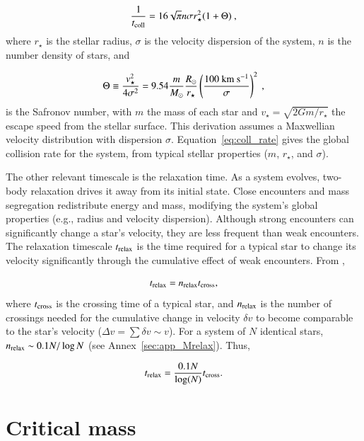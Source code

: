 \begin{equation}
	\label{eq:coll_rate}
	\frac{1}{t_{\rm coll}} = 16\sqrt{\pi} n \sigma r_{\star}^2(1 + \Theta)~,
\end{equation}
where $r_{\star}$ is the stellar radius, $\sigma$ is the velocity dispersion of the system, $n$ is the number density of stars, and

\begin{equation}
	\label{eq:safronov_number}
	\Theta \equiv \frac{v_{\star}^2}{4 \sigma^2} = 9.54 \frac{m}{M_{\odot}} \frac{R_{\odot}}{r_{\star}} \left(\frac{100~{\rm km}~{\rm s}^{-1}}{\sigma}\right)^2~,
\end{equation}
is the Safronov number, with $m$ the mass of each star and $v_{\star} = \sqrt{2Gm/r_{\star}}$ the escape speed from the stellar surface. This derivation assumes a Maxwellian velocity distribution with dispersion $\sigma$. Equation~\eqref{eq:coll_rate} gives the global collision rate for the system, from typical stellar properties ($m$, $r_{\star}$, and $\sigma$).

The other relevant timescale is the relaxation time. As a system evolves, two-body relaxation drives it away from its initial state. Close encounters and mass segregation redistribute energy and mass, modifying the system's global properties (e.g., radius and velocity dispersion). Although strong encounters can significantly change a star's velocity, they are less frequent than weak encounters. The relaxation timescale $t_{\rm relax}$ is the time required for a typical star to change its velocity significantly through the cumulative effect of weak encounters. From \citet{2008gady.book.....B},

\begin{equation}
	\label{eq:trelax}
	t_{\rm relax} = n_{\rm relax}t_{\rm cross},
\end{equation}
where $t_{\rm cross}$ is the crossing time of a typical star, and $n_{\rm relax}$ is the number of crossings needed for the cumulative change in velocity $\delta v$ to become comparable to the star's velocity ($\Delta v = \sum \delta v \sim v$). For a system of $N$ identical stars, $n_{\rm relax} \sim 0.1N/\log N$ (see Annex~\ref{sec:app_Mrelax}). Thus,

\begin{equation}
	\label{eq:trelax_2}
	t_{\rm relax} = \frac{0.1N}{\log(N)}t_{\rm cross}.
\end{equation}

\section{Critical mass}
\label{sec:2.1_Mcrit}

